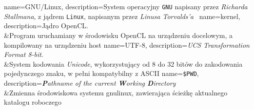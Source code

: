 %
%

{
	name={GNU/Linux},
	description={System operacyjny \texttt{GNU} napisany przez \emph{Richarda Stallmana}, z jądrem \texttt{Linux}, napisanym przez \emph{Linusa Torvalds'a}~\cite{gnulinux}}
}
{
	name={kernel},
	description={Jądro \gls{OpenCL}.\\&Program uruchamiany w środowisku OpenCL na urządzeniu docelowym, a kompilowany na urządzeniu host}
}
{
	name={UTF-8},
	description={\emph{UCS Transformation Format 8-bit}.\\&System kodowania \emph{Unicode}, wykorzystujący od 8 do 32 bitów do zakodowania pojedynczego znaku, w pełni kompatybilny z \gls{ASCII}}
}
{
	name={\texttt{\$PWD}},
	description={\emph{\textbf{P}athname of the current \textbf{W}orking \textbf{D}irectory}\\&Zmienna środowiskowa systemu \gls{gnulinux}, zawierająca ścieżkę aktualnego katalogu roboczego}
}

